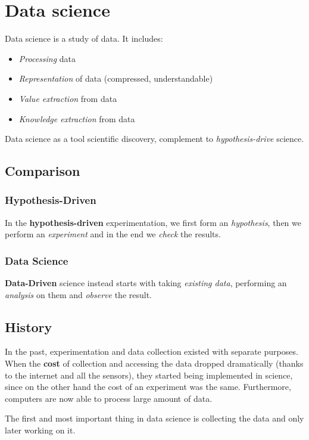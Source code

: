 \section{Data science}
\begin{definition}
	Data science is a study of data. It includes:
	\begin{itemize}
		\item \textit{Processing} data
		\item \textit{Representation} of data (compressed, understandable)
		\item \textit{Value extraction} from data
		\item \textit{Knowledge extraction} from data
	\end{itemize}
\end{definition}
\begin{definition}
	Data science as a tool scientific discovery, complement to \textit{hypothesis-drive} science.
\end{definition}
\subsection{Comparison}
\subsubsection{Hypothesis-Driven}
In the \textbf{hypothesis-driven} experimentation, we first form an \textit{hypothesis}, then we perform an \textit{experiment} and in the end we \textit{check} the results.
\subsubsection{Data Science}
\textbf{Data-Driven} science instead starts with taking \textit{existing data}, performing an \textit{analysis} on them and \textit{observe} the result.
\subsection{History}
In the past, experimentation and data collection existed with separate purposes. When the \textbf{cost} of collection and accessing the data dropped dramatically (thanks to the internet and all the sensors), they started being implemented in science, since on the other hand the cost of an experiment was the same. Furthermore, computers are now able to process large amount of data.

\begin{observation}
	The first and most important thing in data science is collecting the data and only later working on it.
\end{observation}

